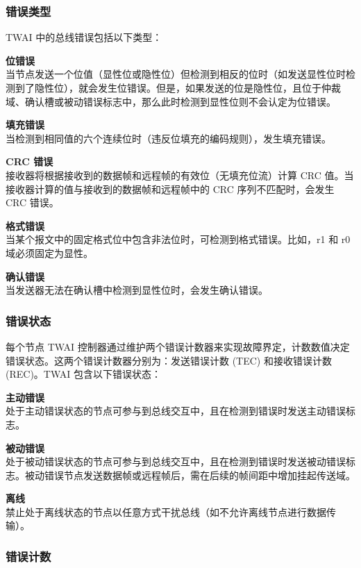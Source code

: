 \documentclass[main\_\_CN.tex]{subfiles}
\begin{document}
\subsubsection{错误类型}

TWAI 中的总线错误包括以下类型：

{\bfseries 位错误}\\
当节点发送一个位值（显性位或隐性位）但检测到相反的位时（如发送显性位时检测到了隐性位），就会发生位错误。但是，如果发送的位是隐性位，且位于仲裁域、确认槽或被动错误标志中，那么此时检测到显性位则不会认定为位错误。

{\bfseries 填充错误}\\
当检测到相同值的六个连续位时（违反位填充的编码规则），发生填充错误。

{\bfseries CRC 错误}\\
接收器将根据接收到的数据帧和远程帧的有效位（无填充位流）计算 CRC 值。当接收器计算的值与接收到的数据帧和远程帧中的 CRC 序列不匹配时，会发生 CRC 错误。

{\bfseries 格式错误}\\
当某个报文中的固定格式位中包含非法位时，可检测到格式错误。比如，r1 和 r0 域必须固定为显性。

{\bfseries 确认错误}\\
当发送器无法在确认槽中检测到显性位时，会发生确认错误。

\subsubsection{错误状态}
每个节点 TWAI 控制器通过维护两个错误计数器来实现故障界定，计数数值决定错误状态。这两个错误计数器分别为：发送错误计数 (TEC) 和接收错误计数 (REC)。TWAI 包含以下错误状态：

{\bfseries 主动错误}\\
处于主动错误状态的节点可参与到总线交互中，且在检测到错误时发送主动错误标志。

{\bfseries 被动错误}\\
处于被动错误状态的节点可参与到总线交互中，且在检测到错误时发送被动错误标志。被动错误节点发送数据帧或远程帧后，需在后续的帧间距中增加挂起传送域。

{\bfseries 离线}\\
禁止处于离线状态的节点以任意方式干扰总线（如不允许离线节点进行数据传输）。

\subsubsection{错误计数}
\end{document}
